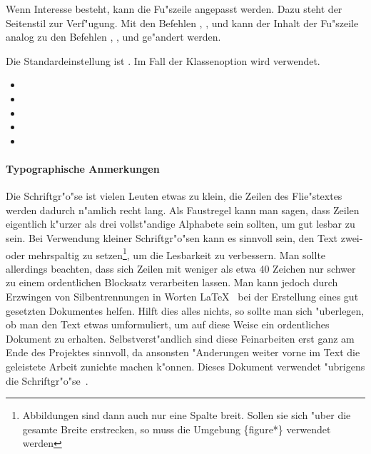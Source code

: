 \documentclass[twoside,colorback,accentcolor=tud4c,11pt]{tudreport}
\begin{document}
    Wenn Interesse besteht, kann die Fu"szeile angepasst werden. Dazu steht der Seitenstil
     zur Verf"ugung. Mit den Befehlen , , 
    und  kann der Inhalt der Fu"szeile analog zu den
    Befehlen , ,
     und  ge"andert
    werden.

    Die Standardeinstellung ist . Im Fall der Klassenoption 
    wird  verwendet.
    \begin{itemize}\itemsep-1ex
      \item {}
      \item {}
      \item {}
      \item {}
      \item{}
    \end{itemize}
    
    \paragraph{Typographische Anmerkungen}
    Die Schriftgr"o"se \textaccent{9.5pt} ist vielen Leuten etwas zu klein,
    die Zeilen des Flie"stextes werden dadurch n"amlich recht lang.
    Als Faustregel kann man sagen, dass Zeilen eigentlich k"urzer als drei
    vollst"andige Alphabete sein sollten, um gut
    lesbar zu sein. Bei Verwendung kleiner Schriftgr"o"sen kann es sinnvoll
    sein, den Text zwei- oder mehrspaltig zu setzen\footnote{Abbildungen sind
    dann auch nur eine Spalte breit. Sollen sie sich "uber die gesamte Breite
    erstrecken, so muss die Umgebung \{figure*\} verwendet
    werden}, um die Lesbarkeit zu
    verbessern. Man sollte allerdings beachten, dass sich Zeilen mit weniger 
    als etwa 40 Zeichen nur schwer zu einem ordentlichen Blocksatz verarbeiten
    lassen. Man kann jedoch durch Erzwingen von Silbentrennungen in
    Worten \LaTeX~ bei der Erstellung eines gut gesetzten Dokumentes helfen.
    Hilft dies alles nichts, so sollte man sich "uberlegen, ob man den
    Text etwas umformuliert, um auf diese Weise ein ordentliches Dokument zu
    erhalten. Selbstverst"andlich sind diese Feinarbeiten erst ganz am Ende
    des Projektes sinnvoll, da ansonsten "Anderungen weiter vorne im Text die
    geleistete Arbeit zunichte machen k"onnen. Dieses Dokument verwendet "ubrigens die
    Schriftgr"o"se~.
\end{document}
